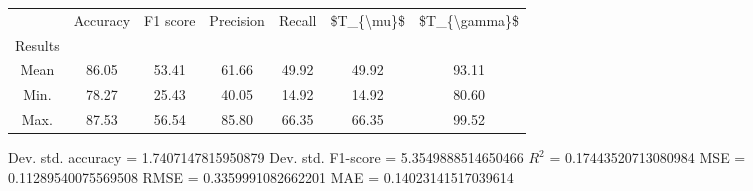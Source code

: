 \begin{tabular}{|c|c|c|c|c|c|c|}
\toprule
{} &  Accuracy &  F1 score &  Precision &  Recall &  \$T\_\{\textbackslash mu\}\$ &  \$T\_\{\textbackslash gamma\}\$ \\
Results &           &           &            &         &            &               \\
\hline
Mean    &     86.05 &     53.41 &      61.66 &   49.92 &      49.92 &         93.11 \\
Min.    &     78.27 &     25.43 &      40.05 &   14.92 &      14.92 &         80.60 \\
Max.    &     87.53 &     56.54 &      85.80 &   66.35 &      66.35 &         99.52 \\
\bottomrule
\end{tabular}

 Dev. std. accuracy = 1.7407147815950879
 Dev. std. F1-score = 5.3549888514650466
 $R^2$ = 0.17443520713080984
 MSE = 0.11289540075569508
 RMSE = 0.3359991082662201
 MAE = 0.14023141517039614